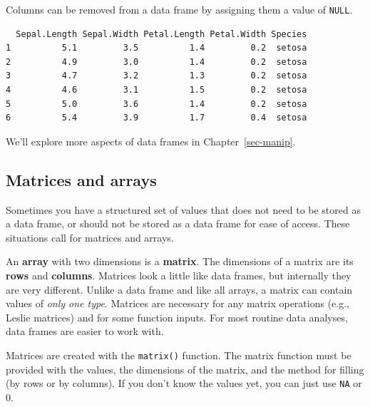 \documentclass[
  13,
  letterpaper,
]{report}
\newenvironment{Shaded}{\begin{snugshade}}{\end{snugshade}}
\newcommand{\ConstantTok}[1]{\textcolor[rgb]{0.56,0.35,0.01}{#1}}
\newcommand{\FunctionTok}[1]{\textcolor[rgb]{0.28,0.35,0.67}{#1}}
\newcommand{\NormalTok}[1]{\textcolor[rgb]{0.00,0.23,0.31}{#1}}
\newcommand{\OtherTok}[1]{\textcolor[rgb]{0.00,0.23,0.31}{#1}}
\newcommand{\SpecialCharTok}[1]{\textcolor[rgb]{0.37,0.37,0.37}{#1}}
\begin{document}
Columns can be removed from a data frame by assigning them a value of
\texttt{NULL}.

\begin{Shaded}
\end{Shaded}

\begin{verbatim}
  Sepal.Length Sepal.Width Petal.Length Petal.Width Species
1          5.1         3.5          1.4         0.2  setosa
2          4.9         3.0          1.4         0.2  setosa
3          4.7         3.2          1.3         0.2  setosa
4          4.6         3.1          1.5         0.2  setosa
5          5.0         3.6          1.4         0.2  setosa
6          5.4         3.9          1.7         0.4  setosa
\end{verbatim}

We'll explore more aspects of data frames in Chapter~\ref{sec-manip}.

\subsection{Matrices and arrays}\label{sec-object-struct-mat}

Sometimes you have a structured set of values that does not need to be
stored as a data frame, or should not be stored as a data frame for ease
of access. These situations call for matrices and arrays.

An \textbf{array} with two dimensions is a \textbf{matrix}. The
dimensions of a matrix are its \textbf{rows} and \textbf{columns}.
Matrices look a little like data frames, but internally they are very
different. Unlike a data frame and like all arrays, a matrix can contain
values of \emph{only one type}. Matrices are necessary for any matrix
operations (e.g., Leslie matrices) and for some function inputs. For
most routine data analyses, data frames are easier to work with.

Matrices are created with the \texttt{matrix()} function. The matrix
function must be provided with the values, the dimensions of the matrix,
and the method for filling (by rows or by columns). If you don't know
the values yet, you can just use \texttt{NA} or 0.
\end{document}
